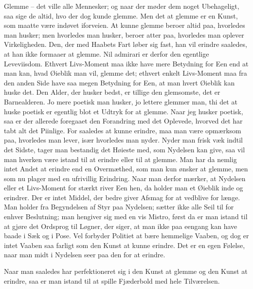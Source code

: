 \documentclass[12pt,a4paper]{article}
\begin{document}
Glemme – det ville alle Mennesker; og naar der møder dem noget Ubehageligt, saa sige de altid, hvo der dog kunde glemme. Men det at glemme er en Kunst, som maatte være indøvet iforveien. At kunne glemme beroer altid paa, hvorledes man husker; men hvorledes man husker, beroer atter paa, hvorledes man oplever Virkeligheden. Den, der med Haabets Fart løber sig fast, han vil erindre saaledes, at han ikke formaaer at glemme. Nil admirari er derfor den egentlige Leveviisdom. Ethvert Livs-Moment maa ikke have mere Betydning for Een end at man kan, hvad Øieblik man vil, glemme det; ethvert enkelt Livs-Moment maa fra den anden Side have saa megen Betydning for Een, at man hvert Øieblik kan huske det. Den Alder, der husker bedst, er tillige den glemsomste, det er Barnealderen. Jo mere poetisk man husker, jo lettere glemmer man, thi det at huske poetisk er egentlig blot et Udtryk for at glemme. Naar jeg husker poetisk, saa er der allerede foregaaet den Forandring med det Oplevede, hvorved det har tabt alt det Piinlige. For saaledes at kunne erindre, maa man være opmærksom paa, hvorledes man lever, især hvorledes man nyder. Nyder man frisk væk indtil det Sidste, tager man bestandig det Høieste med, som Nydelsen kan give, saa vil man hverken være istand til at erindre eller til at glemme. Man har da nemlig intet Andet at erindre end en Overmæthed, som man kun ønsker at glemme, men som nu plager med en ufrivillig Erindring. Naar man derfor mærker, at Nydelsen eller et Livs-Moment for stærkt river Een hen, da holder man et Øieblik inde og erindrer. Der er intet Middel, der bedre giver Afsmag for at vedblive for længe. Man holder fra Begyndelsen af Styr paa Nydelsen; sætter ikke alle Seil til for enhver Beslutning; man hengiver sig med en vis Mistro, først da er man istand til at gjøre det Ordsprog til Løgner, der siger, at man ikke paa eengang kan have baade i Sæk og i Pose. Vel forbyder Politiet at bære hemmelige Vaaben, og dog er intet Vaaben saa farligt som den Kunst at kunne erindre. Det er en egen Følelse, naar man midt i Nydelsen seer paa den for at erindre.

Naar man saaledes har perfektioneret sig i den Kunst at glemme og den Kunst at erindre, saa er man istand til at spille Fjæderbold med hele Tilværelsen.
\end{document}
